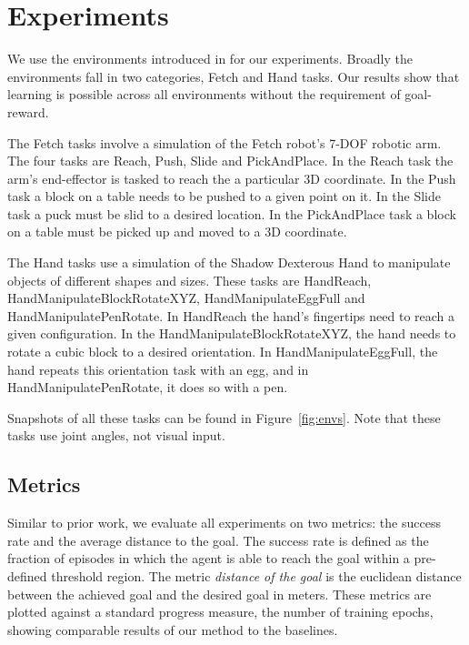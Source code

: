 \section{Experiments}
\label{sec:experiments}
We use the environments introduced in \citet{plappert2018multi} for our experiments.
Broadly the environments fall in two categories, Fetch and Hand tasks.
Our results show that learning is possible across all environments
without the requirement of goal-reward.

The Fetch tasks involve a simulation of the Fetch robot's 7-DOF robotic arm. The four tasks are Reach, Push,
Slide and PickAndPlace.
In the Reach task the arm's end-effector is tasked to reach the a particular 3D coordinate. 
In the Push task a block on a table needs to be pushed to a given point on it.
In the Slide task a puck must be slid to a desired location.
In the PickAndPlace task a block on a table must be picked up and moved to a
3D coordinate.

The Hand tasks use a simulation of the Shadow Dexterous Hand to manipulate objects of
different shapes and sizes. These tasks are HandReach,
HandManipulateBlockRotateXYZ, HandManipulateEggFull and HandManipulatePenRotate.
In HandReach the hand's fingertips need to reach a given configuration.
In the HandManipulateBlockRotateXYZ, the hand needs to rotate a cubic
block to a desired orientation.
In HandManipulateEggFull, the hand repeats this orientation task with an egg, and in
HandManipulatePenRotate, it does so with a pen.

Snapshots of all these tasks can be found in Figure~\ref{fig:envs}. Note that
these tasks use joint angles, not visual input.


\subsection{Metrics}
Similar to prior work, we evaluate all experiments on two metrics: the success
rate and the average distance to the goal. The success rate is defined as the
fraction of episodes in which the agent is able to reach the goal within a
pre-defined threshold region.
The metric \emph{distance of the goal} is the euclidean distance between
the achieved goal and the desired goal in meters.
These metrics are plotted against a standard progress measure, the
number of training epochs, showing
comparable results of our method to the baselines.

